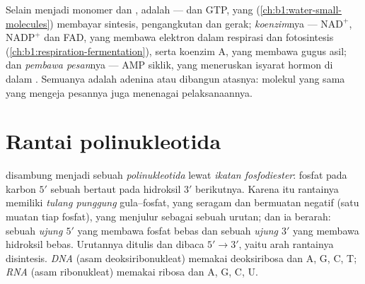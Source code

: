 \begin{proposition}\label{prop:b1:nucleic-acids:threejobs}
Selain menjadi monomer  dan ,  adalah \emph{}  ---  dan GTP, yang 
(\cref{ch:b1:water-small-molecules}) membayar sintesis, pengangkutan dan
gerak; \emph{koenzim}nya --- $\mathrm{NAD^+}$, $\mathrm{NADP^+}$ dan
FAD, yang membawa elektron dalam respirasi dan fotosintesis
(\cref{ch:b1:respiration-fermentation}), serta koenzim A, yang membawa
gugus asil; dan \emph{pembawa pesan}nya --- AMP siklik, yang meneruskan
isyarat hormon di dalam . Semuanya adalah  adenina atau
dibangun atasnya: molekul yang sama yang mengeja pesannya juga menenagai
pelaksanaannya.
\end{proposition}

\section{Rantai polinukleotida}

\begin{definition}\label{def:b1:nucleic-acids:chain}
 disambung menjadi sebuah
\emph{polinukleotida} lewat \emph{ikatan
fosfodiester}: fosfat pada karbon $5'$
sebuah  bertaut pada hidroksil $3'$  berikutnya.
Karena itu rantainya memiliki \emph{tulang punggung} gula--fosfat, yang
seragam dan bermuatan negatif (satu muatan tiap fosfat), yang 
menjulur sebagai sebuah urutan; dan ia berarah: sebuah \emph{ujung
$5'$} yang membawa fosfat bebas dan sebuah
\emph{ujung $3'$} yang membawa hidroksil bebas.
Urutannya ditulis dan dibaca $5' \to 3'$, yaitu arah rantainya
disintesis. \emph{DNA} (asam deoksiribonukleat) memakai
deoksiribosa dan  A, G, C, T; \emph{RNA} (asam
ribonukleat) memakai ribosa dan A, G, C, U.
\end{definition}

